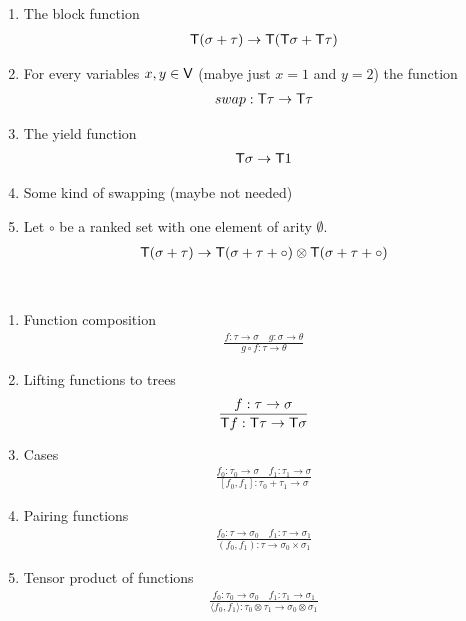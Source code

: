 \begin{definition}
\begin{enumerate}
    \item The block function
    \begin{align*}
        \mathsf T (\sigma + \tau) \to \mathsf T (\mathsf T \sigma + \mathsf T \tau)
    \end{align*}
    \item For every variables $x,y \in \mathsf V$ (mabye just $x=1$ and $y=2$) the function 
    \begin{align*}
        swap : \mathsf T \tau \to \mathsf T \tau
    \end{align*}
    \item The yield function
    \begin{align*}
        \mathsf T \sigma \to \mathsf T 1
    \end{align*}
    \item Some kind of swapping (maybe not needed)
    \item Let $\circ$ be a ranked set with one element of arity $\emptyset$.
    \begin{align*}
        \mathsf T(\sigma+\tau) \to \mathsf T(\sigma+\tau+\circ) \otimes \mathsf T(\sigma+\tau+\circ)
    \end{align*}
\end{enumerate}
\end{definition}



\begin{definition}
    [Combinators] \label{def:combinators} \ 
    \begin{enumerate}
    \item Function composition
    \begin{align*}
    \frac{f : \tau \to \sigma \quad g : \sigma \to \theta} {g \circ f : \tau \to \theta}
\end{align*}

\item Lifting functions to trees
\begin{align*}
    \frac{f : \tau \to \sigma} {\mathsf T f : \mathsf T \tau \to \mathsf T \sigma}
\end{align*}
\item Cases
\begin{align*}
    \frac{f_0 : \tau_0 \to \sigma \quad f_1 : \tau_1 \to \sigma} {[f_0,f_1] : \tau_0 + \tau_1 \to \sigma}
\end{align*}

\item Pairing functions
\begin{align*}
    \frac{f_0 : \tau \to \sigma_0 \quad f_1 : \tau \to \sigma_1} {(f_0,f_1) : \tau \to \sigma_0 \times \sigma_1}
\end{align*}

\item Tensor product of functions
\begin{align*}
    \frac{f_0 : \tau_0 \to \sigma_0 \quad f_1 : \tau_1 \to \sigma_1} {\langle f_0,f_1 \rangle : \tau_0 \otimes \tau_1 \to \sigma_0 \otimes \sigma_1}
\end{align*}
\end{enumerate}
\end{definition}

